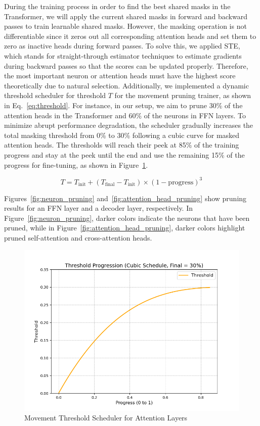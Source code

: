 During the training process in order to find the best shared masks in the Transformer,
we will apply the current shared masks in forward and backward passes to train learnable shared masks.
However, the masking operation is not differentiable since it zeros out all corresponding attention heads
and set them to zero as inactive heads during forward passes.
To solve this, we applied STE, which stands for straight-through estimator techniques to estimate gradients
during backward passes so that the scores can be updated properly.
Therefore, the most important neuron or attention heads must have the highest score theoretically due to natural selection.
Additionally, we implemented a dynamic threshold scheduler for threshold $T$ for the movement pruning trainer, as shown in Eq.~\ref{eq:threshold}.
For instance, in our setup, we aim to prune 30\% of the attention heads in the Transformer and 60\% of the neurons in FFN layers.
To minimize abrupt performance degradation, the scheduler gradually increases the total masking threshold from 0\% to 30\%
following a cubic curve for masked attention heads.
The thresholds will reach their peek at 85\% of the training progress and stay at the peek
until the end and use the remaining 15\% of the progress for fine-tuning, as shown in Figure~\ref{fig:sub3}.

\begin{equation}
T = T_{\text{init}} + (T_{\text{final}} - T_{\text{init}}) \times (1 - \text{progress})^3
\label{eq:threshold}
\end{equation}


Figures~\ref{fig:neuron_pruning} and~\ref{fig:attention_head_pruning} show pruning results for an FFN layer and a decoder layer, respectively.
In Figure~\ref{fig:neuron_pruning}, darker colors indicate the neurons that have been pruned,
while in Figure~\ref{fig:attention_head_pruning}, darker colors highlight pruned self-attention and cross-attention heads.

\begin{figure}[hbpt]
    \centering
    \includegraphics[width=0.9\linewidth]{images/1}
    \caption{Movement Threshold Scheduler for Attention Layers}
    \label{fig:sub3}
\end{figure}

